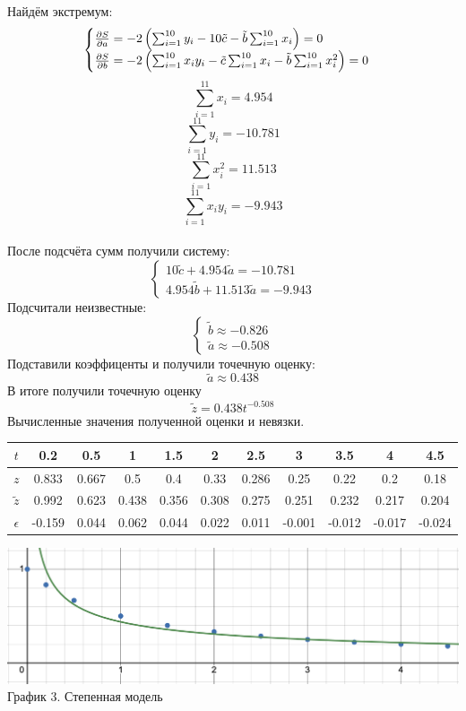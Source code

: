 \documentclass{article}
\begin{document}
Найдём экстремум:
\[\begin{cases}
    \pdv{S}{a} = -2\left(\sum_{i=1}^{10}y_i - 10\tilde{c} - \tilde{b}\sum_{i=1}^{10}x_i\right) = 0\\
    \pdv{S}{b} = -2\left(\sum_{i=1}^{10}x_iy_i - \tilde{c}\sum_{i=1}^{10}x_i - \tilde{b}\sum_{i=1}^{10}x_i^2\right) = 0
\end{cases}\]
\[\sum_{i=1}^{11}x_i = 4.954\]
\[\sum_{i=1}^{11}y_i = -10.781\]
\[\sum_{i=1}^{11}x_i^2 = 11.513\]
\[\sum_{i=1}^{11}x_iy_i = -9.943\]
\\
После подсчёта сумм получили систему:
\[\begin{cases}
    10\tilde{c} + 4.954\tilde{a} = -10.781\\
    4.954\tilde{b} + 11.513\tilde{a} = -9.943
\end{cases}\]
Подсчитали неизвестные:
\[\begin{cases}
    \tilde{b}  \approx -0.826\\
    \tilde{a}  \approx -0.508
\end{cases}\]
Подставили коэффиценты и получили точечную оценку:
\[\tilde{a} \approx 0.438\]
В итоге получили точечную оценку
\[\tilde{z} = 0.438t^{-0.508}\]
Вычисленные значения полученной оценки и невязки.
\begin{table}[H]
    \centering
    \begin{tabular}{|c|*{10}{c|}}
        \hline
        \(t\) & 0.2 & 0.5 & 1 & 1.5 & 2 & 2.5 & 3 & 3.5 & 4 & 4.5 \\
        \hline
        \(z\) &0.833&0.667 & 0.5& 0.4& 0.33& 0.286& 0.25& 0.22& 0.2& 0.18 \\
        \hline
        \(\tilde{z}\) & 0.992 & 0.623 & 0.438 & 0.356 & 0.308& 0.275& 0.251 & 0.232 & 0.217 & 0.204 \\
        \hline
        \(\epsilon\) & -0.159 & 0.044 & 0.062 & 0.044 & 0.022& 0.011 & -0.001 & -0.012 & -0.017 & -0.024  \\
        \hline
    \end{tabular}
\end{table}
\begin{center}
    \includegraphics[width=.9\textwidth]{pow.png}\\
    График 3. Степенная модель
\end{center}
\end{document}
